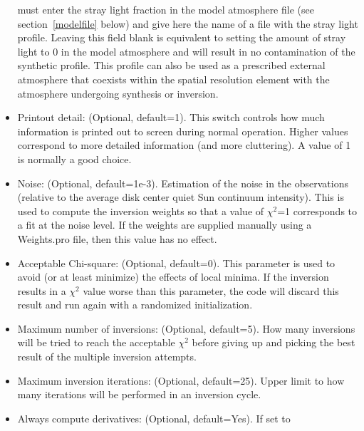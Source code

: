 \begin{itemize}
  must enter the stray light fraction in the model atmosphere file
  (see section~\ref{modelfile} below) and give here the name of a file
  with the stray light profile.  Leaving this field blank is
  equivalent to setting the amount of stray light to 0 in the model
  atmosphere and will result in no contamination of the synthetic
  profile. This profile can also be used as a prescribed external
  atmosphere that coexists within the spatial resolution element with
  the atmosphere undergoing synthesis or inversion. 
\item Printout detail: (Optional, default=1). This switch controls how
  much information is printed out to screen during normal
  operation. Higher values correspond to more detailed information
  (and more cluttering).  A value of 1 is normally a good choice.
\item Noise: (Optional, default=1e-3). Estimation of the noise in the
  observations (relative to the average disk center quiet Sun
  continuum intensity). This is used to compute the inversion weights
  so that a value of $\chi^2$=1 corresponds to a fit at the noise
  level. If the weights are supplied manually using a Weights.pro
  file, then this value has no effect.
\item Acceptable Chi-square: (Optional, default=0). This parameter is
  used to avoid (or at least minimize) the effects of local minima. If
  the inversion results in a $\chi^2$ value worse than this parameter,
  the code will discard this result and run again with a randomized
  initialization.
\item Maximum number of inversions: (Optional, default=5). How many
  inversions will be tried to reach the acceptable $\chi^2$ before
  giving up and picking the best result of the multiple inversion
  attempts.
\item Maximum inversion iterations: (Optional, default=25). Upper
  limit to how many iterations will be performed in an inversion
  cycle.
\item Always compute derivatives: (Optional, default=Yes). If set to

\end{itemize}
